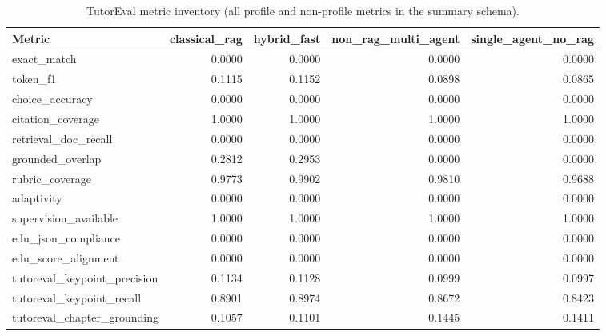 \begin{table}[t]
\caption{TutorEval metric inventory (all profile and non-profile metrics in the summary schema).}
\label{tab:tutoreval_metric_inventory}
\centering
\footnotesize
\begin{tabular}{lrrrr}
\toprule
Metric & classical\_rag & hybrid\_fast & non\_rag\_multi\_agent & single\_agent\_no\_rag \\
\midrule
exact\_match & 0.0000 & 0.0000 & 0.0000 & 0.0000 \\
token\_f1 & 0.1115 & 0.1152 & 0.0898 & 0.0865 \\
choice\_accuracy & 0.0000 & 0.0000 & 0.0000 & 0.0000 \\
citation\_coverage & 1.0000 & 1.0000 & 1.0000 & 1.0000 \\
retrieval\_doc\_recall & 0.0000 & 0.0000 & 0.0000 & 0.0000 \\
grounded\_overlap & 0.2812 & 0.2953 & 0.0000 & 0.0000 \\
rubric\_coverage & 0.9773 & 0.9902 & 0.9810 & 0.9688 \\
adaptivity & 0.0000 & 0.0000 & 0.0000 & 0.0000 \\
supervision\_available & 1.0000 & 1.0000 & 1.0000 & 1.0000 \\
edu\_json\_compliance & 0.0000 & 0.0000 & 0.0000 & 0.0000 \\
edu\_score\_alignment & 0.0000 & 0.0000 & 0.0000 & 0.0000 \\
tutoreval\_keypoint\_precision & 0.1134 & 0.1128 & 0.0999 & 0.0997 \\
tutoreval\_keypoint\_recall & 0.8901 & 0.8974 & 0.8672 & 0.8423 \\
tutoreval\_chapter\_grounding & 0.1057 & 0.1101 & 0.1445 & 0.1411 \\
\bottomrule
\end{tabular}
\end{table}


